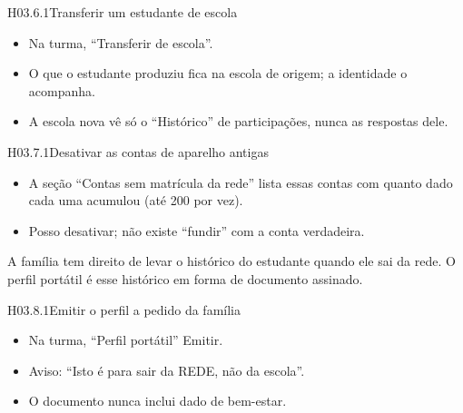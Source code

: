 
\begin{historia}{H03.6.1}{Transferir um estudante de escola}{\pronto}
\aceite
\begin{itemize}
  \item Na turma, \enquote{Transferir de escola}.
  \item O que o estudante produziu fica na escola de origem; a identidade o
    acompanha.
  \item A escola nova vê só o \enquote{Histórico} de participações, nunca as
    respostas dele.
\end{itemize}
\end{historia}


\begin{historia}{H03.7.1}{Desativar as contas de aparelho antigas}{\pronto}
\aceite
\begin{itemize}
  \item A seção \enquote{Contas sem matrícula da rede} lista essas contas com
    quanto dado cada uma acumulou (até 200 por vez).
  \item Posso desativar; não existe \enquote{fundir} com a conta verdadeira.
\end{itemize}
\end{historia}


A família tem direito de levar o histórico do estudante quando ele sai da
rede. O perfil portátil é esse histórico em forma de documento assinado.

\begin{historia}{H03.8.1}{Emitir o perfil a pedido da família}{\pronto}
\aceite
\begin{itemize}
  \item Na turma, \enquote{Perfil portátil} \seta{} Emitir.
  \item Aviso: \enquote{Isto é para sair da REDE, não da escola}.
  \item O documento nunca inclui dado de bem-estar.
\end{itemize}
\end{historia}

